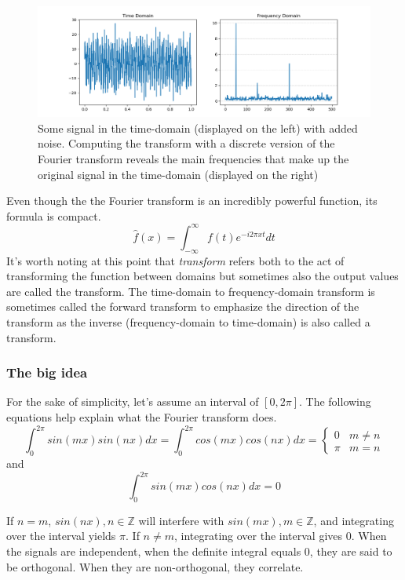 \begin{figure}[ht]
    \centering
    \includegraphics[width=\textwidth]{./images/transform.png}
    \caption{Some signal in the time-domain (displayed on the left) with added noise. Computing the transform with a discrete version of the Fourier transform reveals the main frequencies that make up the original signal in the time-domain (displayed on the right)\label{fig:transform}}
\end{figure}

Even though the the Fourier transform is an incredibly powerful function, its formula is compact. 
$$\hat{f}(x) = \int_{-\infty}^{\infty} f(t)e^{-i2\pi x t} dt$$
It's worth noting at this point that \textit{transform} refers both to the act of transforming the function between domains but sometimes also the output values are called the transform. The time-domain to frequency-domain transform is sometimes called the forward transform to emphasize the direction of the transform as the inverse (frequency-domain to time-domain) is also called a transform.

\subsubsection{The big idea}
For the sake of simplicity, let's assume an interval of $[0, 2\pi]$. The following equations help explain what the Fourier transform does.
\[ \int_0^{2\pi} sin(mx)sin(nx)dx = \int_0^{2\pi} cos(mx)cos(nx)dx= 
\begin{cases} %
    0 & m\neq n \\
    \pi & m=n
\end{cases} 
\]
\noindent and
$$\int_0^{2\pi} sin(mx)cos(nx)dx = 0$$

If $n = m $, $sin(nx), n\in\mathbb{Z}$ will interfere with $sin(mx), m\in\mathbb{Z}$, and integrating over the interval yields $\pi$. If $n \neq m$, integrating over the interval gives 0. When the signals are independent, when the definite integral equals 0, they are said to be orthogonal. When they are non-orthogonal, they correlate. 

